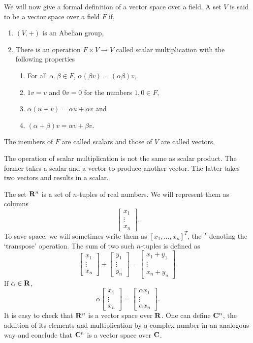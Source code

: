 We will now give a formal definition of a vector space over a field. A set
$V$ is said to be a vector space over a field $F$ if,
\begin{enumerate}
\item $(V, +)$ is an Abelian group,
\item There is an operation $F \times V \rightarrow V$ called scalar 
multiplication with the following properties
\begin{enumerate}
\item For all $\alpha, \beta \in F$, $\alpha(\beta v) = (\alpha\beta)v$,
\item $1v = v$ and $0v = 0$ for the numbers $1, 0 \in F$,
\item $\alpha(u + v) = \alpha u + \alpha v$ and 
\item $(\alpha + \beta)v = \alpha v + \beta v$.
\end{enumerate}
\end{enumerate}
\begin{rem}
The members of $F$ are called scalars and those of $V$ are called vectors.
\end{rem}
\begin{rem}
The operation of scalar multiplication is not the same as scalar product. The
former takes a scalar and a vector to produce another vector. The latter takes
two vectors and results in a scalar.
\end{rem}

The set $\mathbf{R}^n$ is a set of $n$-tuples of real numbers. We will represent them
as columns
\[
\begin{bmatrix} x_1 \\ \vdots \\ x_n\end{bmatrix}.
\]
To save space, we will sometimes write them as $[x_1, \ldots, x_n]^T$, the 
${}^T$ denoting the `transpose' operation. The sum of two such $n$-tuples is 
defined as
\[
\begin{bmatrix} x_1 \\ \vdots \\ x_n\end{bmatrix} + 
\begin{bmatrix} y_1 \\ \vdots \\ y_n\end{bmatrix} =
\begin{bmatrix} x_1 + y_1 \\ \vdots \\ x_n + y_n\end{bmatrix}.
\]
If $\alpha \in \mathbf{R}$,
\[
\alpha\begin{bmatrix} x_1 \\ \vdots \\ x_n\end{bmatrix} 
=\begin{bmatrix} \alpha x_1 \\ \vdots \\ \alpha x_n\end{bmatrix}.
\]
It is easy to check that $\mathbf{R}^n$ is a vector space over $\mathbf{R}$. One can
define $\mathbf{C}^n$, the addition of its elements and multiplication by a complex 
number in an analogous way and conclude that $\mathbf{C}^n$ is a vector space over
$\mathbf{C}$.

